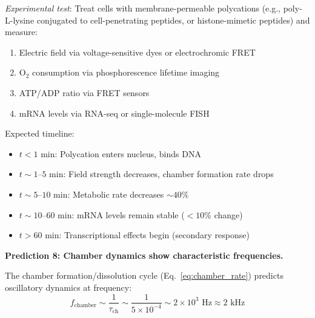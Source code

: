 \documentclass[twocolumn,10pt,aps,prd,superscriptaddress,floatfix,nofootinbib]{revtex4-2}
\theoremstyle{remark}
\begin{document}
\textit{Experimental test}: Treat cells with membrane-permeable polycations (e.g., poly-L-lysine conjugated to cell-penetrating peptides, or histone-mimetic peptides) and measure:
\begin{enumerate}
\item Electric field via voltage-sensitive dyes or electrochromic FRET
\item O$_2$ consumption via phosphorescence lifetime imaging
\item ATP/ADP ratio via FRET sensors
\item mRNA levels via RNA-seq or single-molecule FISH
\end{enumerate}

Expected timeline:
\begin{itemize}
\item $t < 1$ min: Polycation enters nucleus, binds DNA
\item $t \sim 1$--$5$ min: Field strength decreases, chamber formation rate drops
\item $t \sim 5$--$10$ min: Metabolic rate decreases $\sim 40\%$
\item $t \sim 10$--$60$ min: mRNA levels remain stable ($<10\%$ change)
\item $t > 60$ min: Transcriptional effects begin (secondary response)
\end{itemize}

\textbf{Prediction 8: Chamber dynamics show characteristic frequencies.}

The chamber formation/dissolution cycle (Eq.~\eqref{eq:chamber_rate}) predicts oscillatory dynamics at frequency:
\begin{equation}
f_{\mathrm{chamber}} \sim \frac{1}{\tau_{\mathrm{ch}}} \sim \frac{1}{5 \times 10^{-4}} \sim 2 \times 10^3 \text{ Hz} \approx 2 \text{ kHz}
\label{eq:pred_chamber_frequency}
\end{equation}
\end{document}
